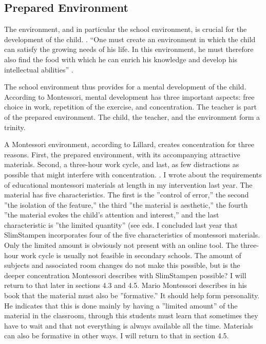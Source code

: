 \documentclass[12pt, a4paper]{article}
\begin{document}
\subsection{Prepared Environment} 
The environment, and in particular the school environment, is crucial for the development of the child. \cite[p.212-217]{Montessori2012}. “One must create an environment in which the child can satisfy the growing needs of his life. In this environment, he must therefore also find the food with which he can enrich his knowledge and develop his intellectual abilities” \cite[p.93]{Montessori1952}.

The school environment thus provides for a mental development of the child. According to Montessori, mental development has three important aspects: free choice in work, repetition of the exercise, and concentration. \cite[p.202]{Montessori2020} The teacher is part of the prepared environment. The child, the teacher, and the environment form a trinity.

A Montessori environment, according to Lillard, creates concentration for three reasons. First, the prepared environment, with its accompanying attractive materials. Second, a three-hour work cycle, and last, as few distractions as possible that might interfere with concentration. \cite[p.122-123]{Lillard}. I wrote about the requirements of educational montessori materials at length in my intervention last year. The material has five characteristics. The first is the ''control of error,'' the second ''the isolation of the feature,'' the third ''the material is aesthetic,'' the fourth ''the material evokes the child's attention and interest,'' and the last characteristic is ''the limited quantity'' (see eds. I concluded last year that SlimStampen incorporates four of the five characteristics of montessori materials. Only the limited amount is obviously not present with an online tool. The three-hour work cycle is usually not feasible in secondary schools. The amount of subjects and associated room changes do not make this possible, but is the deeper concentration Montessori describes with SlimStampen possible? I will return to that later in sections 4.3 and 4.5.
Mario Montessori describes in his book that the material must also be ''formative.'' It should help form personality. He indicates that this is done mainly by having a ''limited amount'' of the material in the classroom, through this students must learn that sometimes they have to wait and that not everything is always available all the time. Materials can also be formative in other ways. I will return to that in section 4.5.
\end{document}
